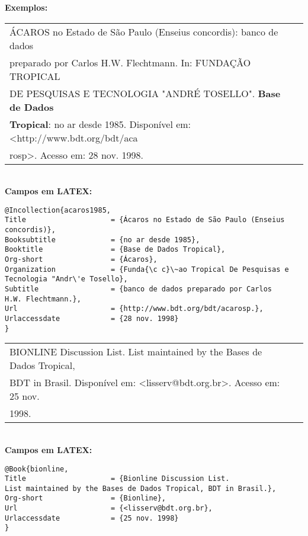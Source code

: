\textbf{Exemplos:} \\
	
\begin{tabular}{|l|c|} \hline
	ÁCAROS no Estado de São Paulo (Enseius concordis): banco de dados \\ preparado por Carlos H.W. Flechtmann. In: FUNDAÇÃO TROPICAL \\DE PESQUISAS E TECNOLOGIA "ANDRÉ TOSELLO". \textbf{Base de Dados} \\\textbf{Tropical}: no ar desde 1985. Disponível em: <http://www.bdt.org/bdt/aca\\rosp>. Acesso em: 28 nov. 1998. 
	                                                                    \\\hline
\end{tabular} \\
	
\textbf{Campos em LATEX:} 
	
\begingroup
\fontsize{10pt}{12pt}\selectfont
\begin{verbatim}
@Incollection{acaros1985,
Title                    = {Ácaros no Estado de São Paulo (Enseius 
concordis)},
Booksubtitle             = {no ar desde 1985},
Booktitle                = {Base de Dados Tropical},
Org-short                = {Ácaros},
Organization             = {Funda{\c c}\~ao Tropical De Pesquisas e 
Tecnologia "Andr\'e Tosello},
Subtitle                 = {banco de dados preparado por Carlos 
H.W. Flechtmann.},
Url                      = {http://www.bdt.org/bdt/acarosp.},
Urlaccessdate            = {28 nov. 1998}
}
\end{verbatim}
\endgroup
	
\begin{tabular}{|l|c|} \hline
	BIONLINE Discussion List. List maintained by the Bases de Dados Tropical, \\BDT in Brasil. Disponível em: <lisserv@bdt.org.br>. Acesso em: 25 nov.\\1998. 
	                                                                          \\\hline
\end{tabular} \\
	
\textbf{Campos em LATEX:} 
	
\begingroup
\fontsize{10pt}{12pt}\selectfont
\begin{verbatim}
@Book{bionline,
Title                    = {Bionline Discussion List.  
List maintained by the Bases de Dados Tropical, BDT in Brasil.},
Org-short                = {Bionline},
Url                      = {<lisserv@bdt.org.br},
Urlaccessdate            = {25 nov. 1998}
}

\end{verbatim}
\endgroup
	
